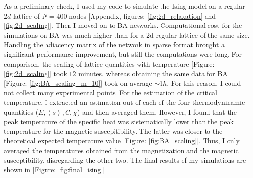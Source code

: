 As a preliminary check, I used my code to simulate the Ising model on a regular $2d$ lattice of $N =400$ nodes [Appendix, figures: \ref{fig:2d_relaxation} and \ref{fig:2d_scaling}]. Then I moved on to BA networks.
Computational cost for the simulations on BA was much higher than for a 2d regular lattice of the same size. Handling the adiacency matrix of the network in sparse format brought a significant performance improvement, but still the computations were long. For comparison, the scaling of lattice quantities with temperature [Figure: \ref{fig:2d_scaling}] took $12$ minutes, whereas obtaining the same data for BA [Figure: \ref{fig:BA_scaling_m_10}] took on average $\sim 1h$.
For this reason, I could not collect many experimental points. For the estimation of the critical temperature, I extracted an estimation out of each of the four thermodyninamic quantities ($E, \left\langle s \right\rangle , C, \chi$) and then averaged them. However, I found that the peak temperature of the specific heat was sistematically lower than the peak temperature for the magnetic suscepitibility. The latter was closer to the theoretical expected temperature value [Figure: \ref{fig:BA_scaling}]. Thus, I only averaged the temperatures obtained from the magnetization and the magnetic susceptibility, disregarding the other two. The final results of my simulations are shown in [Figure: \ref{fig:final_ising}]
